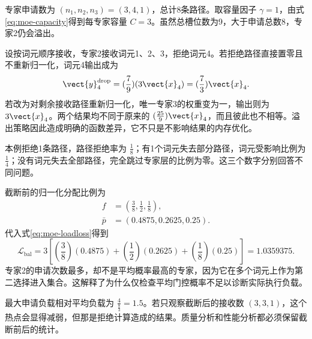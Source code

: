 \documentclass[../textbook.tex]{subfiles}
\begin{document}
\begin{example}
专家申请数为 $(n_1,n_2,n_3)=(3,4,1)$，总计8条路径。取容量因子 $\gamma=1$，由式\eqref{eq:moe-capacity}得到每专家容量 $C=3$。虽然总槽位数为9，大于申请总数8，专家2仍会溢出。

设按词元顺序接收，专家2接收词元1、2、3，拒绝词元4。若拒绝路径直接置零且不重新归一化，词元4输出成为
\begin{equation*}
 \vect{y}_4^{\mathrm{drop}}=(\frac{7}{9})(3\vect{x}_4)=(\frac{7}{3})\vect{x}_4.
\end{equation*}
若改为对剩余接收路径重新归一化，唯一专家3的权重变为一，输出则为 $3\vect{x}_4$。两个结果均不同于原来的 $(\frac{25}{9})\vect{x}_4$，而且彼此也不相等。溢出策略因此造成明确的函数差异，它不只是不影响结果的内存优化。

本例拒绝1条路径，路径拒绝率为 $\frac{1}{8}$；有1个词元失去部分路径，词元受影响比例为 $\frac{1}{4}$；没有词元失去全部路径，完全跳过专家层的比例为零。这三个数字分别回答不同问题。

截断前的归一化分配比例为
\begin{align*}
 f &= \left(\frac{3}{8},\frac{1}{2},\frac{1}{8}\right), \\
 \bar p &= (0.4875,0.2625,0.25).
\end{align*}
代入式\eqref{eq:moe-loadloss}得到
\begin{equation*}
 \mathcal L_{\mathrm{bal}}
 =3\left[(\frac{3}{8})(0.4875)+(\frac{1}{2})(0.2625)+(\frac{1}{8})(0.25)\right]
 =1.0359375.
\end{equation*}
专家2的申请次数最多，却不是平均概率最高的专家，因为它在多个词元上作为第二选择进入集合。这解释了为什么仅检查平均门控概率不足以诊断实际执行负载。

最大申请负载相对平均负载为 $\frac{4}{\frac{8}{3}}=1.5$。若只观察截断后的接收数 $(3,3,1)$，这个热点会显得减弱，但那是拒绝计算造成的结果。质量分析和性能分析都必须保留截断前后的统计。
\end{example}
\end{document}
